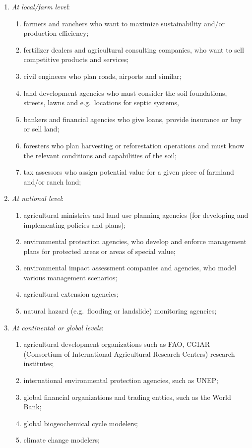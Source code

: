 \documentclass[11pt]{krantz}
\theoremstyle{definition}
\theoremstyle{definition}
\theoremstyle{definition}
\theoremstyle{remark}
\begin{document}
\begin{enumerate}
\def\labelenumi{\arabic{enumi}.}
\item
  \emph{At local/farm level}:

  \begin{enumerate}
  \def\labelenumii{\arabic{enumii}.}
  \item
    farmers and ranchers who want to maximize sustainability and/or
    production efficiency;
  \item
    fertilizer dealers and agricultural consulting companies, who want
    to sell competitive products and services;
  \item
    civil engineers who plan roads, airports and similar;
  \item
    land development agencies who must consider the soil foundations,
    streets, lawns and e.g.~locations for septic systems,
  \item
    bankers and financial agencies who give loans, provide insurance or
    buy or sell land;
  \item
    foresters who plan harvesting or reforestation operations and must
    know the relevant conditions and capabilities of the soil;
  \item
    tax assessors who assign potential value for a given piece of
    farmland and/or ranch land;
  \end{enumerate}
\item
  \emph{At national level}:

  \begin{enumerate}
  \def\labelenumii{\arabic{enumii}.}
  \item
    agricultural ministries and land use planning agencies (for
    developing and implementing policies and plans);
  \item
    environmental protection agencies, who develop and enforce
    management plans for protected areas or areas of special value;
  \item
    environmental impact assessment companies and agencies, who model
    various management scenarios;
  \item
    agricultural extension agencies;
  \item
    natural hazard (e.g.~flooding or landslide) monitoring agencies;
  \end{enumerate}
\item
  \emph{At continental or global levels}:

  \begin{enumerate}
  \def\labelenumii{\arabic{enumii}.}
  \item
    agricultural development organizations such as FAO, CGIAR
    (Consortium of International Agricultural Research Centers) research
    institutes;
  \item
    international environmental protection agencies, such as UNEP;
  \item
    global financial organizations and trading entties, such as the
    World Bank;
  \item
    global biogeochemical cycle modelers;
  \item
    climate change modelers;
  \end{enumerate}
\end{enumerate}
\end{document}
